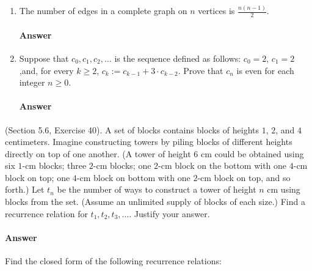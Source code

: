\begin{enumerate}
    \item The number of edges in a complete graph on $n$ vertices is
        $\frac{n(n-1)}{2}$. %

        \paragraph{Answer}
        \todo{}

    \item Suppose that $c_0,c_1,c_2,\ldots$ is the sequence defined as follows:
        $c_0=2$, $c_1=2$,and, for every $k \geq 2$, $c_k:=c_{k-1}+3\cdot c_{k-2}$.
        Prove that $c_n$ is even for each integer $n \geq 0$.

        \paragraph{Answer}
        \todo{}

\end{enumerate}

\collab{\todo{}}

(Section 5.6, Exercise 40). A set of blocks contains blocks of heights $1$, $2$,
and $4$ centimeters.  Imagine constructing towers by piling blocks of different
heights directly on top of one another. (A tower of height $6$ cm could be
obtained using six $1$-cm blocks; three $2$-cm blocks; one $2$-cm block on the
bottom with one $4$-cm block on top; one $4$-cm block on bottom with one $2$-cm
block on top, and so forth.) Let $t_n$  be the number of ways to construct a
tower of height $n$ cm using blocks from the set. (Assume an unlimited supply of
blocks of each size.) Find a recurrence relation for $t_1, t_2, t_3, \ldots $.
Justify your answer.

\paragraph{Answer}
\todo{}

\collab{\todo{}}

Find the closed form of the following recurrence relations:

